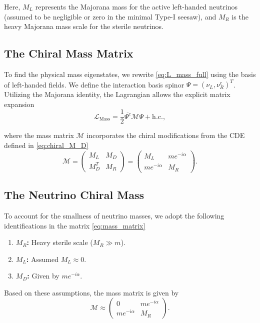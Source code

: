 Here, $M_L$ represents the Majorana mass for the active left-handed neutrinos
(assumed to be negligible or zero in the minimal Type-I seesaw), and $M_R$ is
the heavy Majorana mass scale for the sterile neutrinos.

\subsection{The Chiral Mass Matrix}

To find the physical mass eigenstates, we rewrite \eqref{eq:L_mass_full} using
the basis of left-handed fields. We define the interaction basis spinor $\Psi =
\left(\nu_L, \nu_R^c\right)^T$. Utilizing the Majorana identity, the Lagrangian
allows the explicit matrix expansion
\begin{equation}
  \mathcal{L}_{\text{Mass}} = \frac{1}{2} \overline{\Psi^c} \mathcal{M} \Psi +
  \text{h.c.},
\end{equation}

where the mass matrix $\mathcal{M}$ incorporates the chiral modifications from
the CDE defined in \eqref{eq:chiral_M_D}
\begin{equation} \label{eq:mass_matrix}
  \mathcal{M} =
  \begin{pmatrix}
    M_L & M_D \\
    M_D^T & M_R
  \end{pmatrix}
  =
  \begin{pmatrix}
    M_L & m e^{-i\alpha} \\
    m e^{-i\alpha} & M_R
  \end{pmatrix}.
\end{equation}

\subsection{The Neutrino Chiral Mass}

To account for the smallness of neutrino masses, we adopt the following
identifications in the matrix \eqref{eq:mass_matrix}
\begin{enumerate}
  \item \textbf{$M_R$:} Heavy sterile scale ($M_R \gg m$).
  \item \textbf{$M_L$:} Assumed $M_L \approx 0$.
  \item \textbf{$M_D$:} Given by $m e^{-i\alpha}$.
\end{enumerate}

Based on these assumptions, the mass matrix is given by
\begin{equation} \label{eq:mass_matrix_approx}
  \mathcal{M} \approx \begin{pmatrix} 0 & m e^{-i\alpha} \\ m e^{-i\alpha} &
  M_R \end{pmatrix}.
\end{equation}

